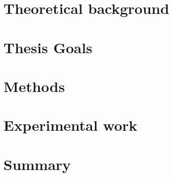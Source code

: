 \documentclass[justified,nofonts,nobib,openany]{tufte-book}
\begin{document}
\tableofcontents %

\chapter{Theoretical background}\label{chap:background}


\chapter{Thesis Goals}\label{chap:goals}


\chapter{Methods}\label{chap:methods}

	
\chapter{Experimental work}\label{chap:Experimental_work}


%

\chapter{Summary}\label{chap:summary}
%

\printbibliography
\end{document}
